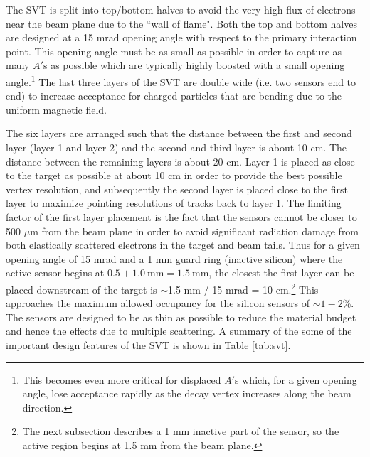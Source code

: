 The SVT is split into top/bottom halves to avoid the very high flux of electrons near the beam plane due to the ``wall of flame". Both the top and bottom halves are designed at a 15 mrad opening angle with respect to the primary interaction point. This opening angle must be as small as possible in order to capture as many $A'$s as possible which are typically highly boosted with a small opening angle.\footnote{This becomes even more critical for displaced $A'$s which, for a given opening angle, lose acceptance rapidly as the decay vertex increases along the beam direction.} The last three layers of the SVT are double wide (i.e. two sensors end to end) to increase acceptance for charged particles that are bending due to the uniform magnetic field.

The six layers are arranged such that the distance between the first and second layer (layer 1 and layer 2) and the second and third layer is about 10 cm. The distance between the remaining layers is about 20 cm. Layer 1 is placed as close to the target as possible at about 10 cm in order to provide the best possible vertex resolution, and subsequently the second layer is placed close to the first layer to maximize pointing resolutions of tracks back to layer 1. The limiting factor of the first layer placement is the fact that the sensors cannot be closer to 500 $\mu$m from the beam plane in order to avoid significant radiation damage from both elastically scattered electrons in the target and beam tails. Thus for a given opening angle of 15 mrad and a 1 mm guard ring (inactive silicon) where the active sensor begins at $0.5 + 1.0 \ \mathrm{mm}= 1.5 \ \mathrm{mm}$, the closest the first layer can be placed downstream of the target is $\sim$1.5 mm / 15 mrad = 10 cm.\footnote{The next subsection describes a 1 mm inactive part of the sensor, so the active region begins at 1.5 mm from the beam plane.} This approaches the maximum allowed occupancy for the silicon sensors of $\sim 1-2$\%. The sensors are designed to be as thin as possible to reduce the material budget and hence the effects due to multiple scattering. A summary of the some of the important design features of the SVT is shown in Table \ref{tab:svt}.


